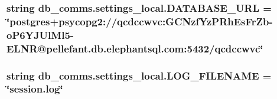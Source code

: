 \subsubsection[{D\+A\+T\+A\+B\+A\+S\+E\+\_\+\+U\+R\+L}]{\setlength{\rightskip}{0pt plus 5cm}string db\+\_\+comms.\+settings\+\_\+local.\+D\+A\+T\+A\+B\+A\+S\+E\+\_\+\+U\+R\+L = \char`\"{}postgres+psycopg2\+://qcdccwvc\+:\+G\+C\+Nzf\+Yz\+P\+Rh\+Es\+Fr\+Zb-\/o\+P6\+Y\+J\+Ul\+Ml5-\/E\+L\+N\+R@pellefant.\+db.\+elephantsql.\+com\+:5432/qcdccwvc\char`\"{}}\label{namespacedb__comms_1_1settings__local_a8eb71159b43e28de397305844fa2a891}
\hypertarget{namespacedb__comms_1_1settings__local_a909832b9d5522628a8edde898db1b8b4}{}
\subsubsection[{L\+O\+G\+\_\+\+F\+I\+L\+E\+N\+A\+M\+E}]{\setlength{\rightskip}{0pt plus 5cm}string db\+\_\+comms.\+settings\+\_\+local.\+L\+O\+G\+\_\+\+F\+I\+L\+E\+N\+A\+M\+E = \char`\"{}session.\+log\char`\"{}}\label{namespacedb__comms_1_1settings__local_a909832b9d5522628a8edde898db1b8b4}

